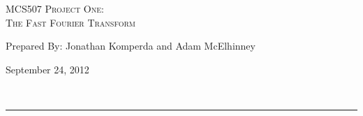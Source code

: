 \begin{center}
\textsc{\Large MCS507 Project One:\\}
\textsc{The Fast Fourier Transform}
\end{center}
\begin{minipage}{0.6\textwidth}
\begin{flushleft}
	Prepared By: Jonathan Komperda and Adam McElhinney
\end{flushleft}
\end{minipage}
\begin{minipage}{0.39\textwidth}
\begin{flushright}
	September 24, 2012
\end{flushright}
\end{minipage}\\[0.01in]
\hrule